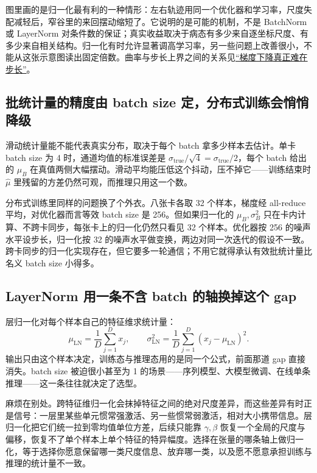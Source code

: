 图里画的是归一化最有利的一种情形：左右轨迹用同一个优化器和学习率，尺度失配减轻后，窄谷里的来回摆动缩短了。它说明的是可能的机制，不是 BatchNorm 或 LayerNorm 对条件数的保证；真实收益取决于病态有多少来自逐坐标尺度、有多少来自相关结构。归一化有时允许显著调高学习率，另一些问题上改善很小，不能从这张示意图读出固定倍数。曲率与步长上界之间的关系见\hyperref[sec:09-Convex-Optimization/06-Optimization-Algorithms/01]{``梯度下降真正难在步长''}。

\subsection{批统计量的精度由 batch size 定，分布式训练会悄悄降级}

滑动统计量能不能代表真实分布，取决于每个 batch 拿多少样本去估计。单卡 batch size 为 4 时，通道均值的标准误差是 \(\sigma_{\text{true}}/\sqrt4=\sigma_{\text{true}}/2\)，每个 batch 给出的 \(\mu_B\) 在真值两侧大幅摆动。滑动平均能压低这个抖动，压不掉它——训练结束时 \(\widehat\mu\) 里残留的方差仍然可观，而推理只用这一个数。

分布式训练里同样的问题换了个外衣。八张卡各取 32 个样本，梯度经 all-reduce 平均，对优化器而言等效 batch size 是 256。但如果归一化的 \(\mu_B,\sigma_B^2\) 只在卡内计算、不跨卡同步，每张卡上的归一化仍然只看见 32 个样本。优化器按 256 的噪声水平设步长，归一化按 32 的噪声水平做变换，两边对同一次迭代的假设不一致。跨卡同步的归一化实现存在，但它要多一轮通信；不用它就得承认有效批统计量比名义 batch size 小得多。

\subsection{LayerNorm 用一条不含 batch 的轴换掉这个 gap}

层归一化对每个样本自己的特征维求统计量：
\[
\mu_{\mathrm{LN}}=\frac1D\sum_{j=1}^D x_j,\qquad
\sigma_{\mathrm{LN}}^2=\frac1D\sum_{j=1}^D(x_j-\mu_{\mathrm{LN}})^2.
\]
输出只由这个样本决定，训练态与推理态用的是同一个公式，前面那道 gap 直接消失。batch size 被迫很小甚至为 1 的场景——序列模型、大模型微调、在线单条推理——这一条往往就决定了选型。

麻烦在别处。跨特征维归一化会抹掉特征之间的绝对尺度差异，而这些差异有时正是信号：一层里某些单元惯常强激活、另一些惯常弱激活，相对大小携带信息。层归一化把它们统一拉到零均值单位方差，后续只能靠 \(\gamma,\beta\) 恢复一个全局的尺度与偏移，恢复不了单个样本上单个特征的特异幅度。选择在张量的哪条轴上做归一化，等于选择你愿意保留哪一类尺度信息、放弃哪一类，以及愿不愿意承担训练与推理的统计量不一致。

